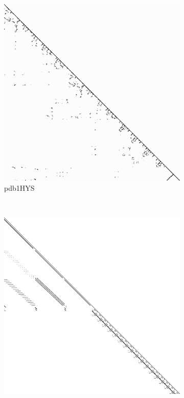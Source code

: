 \begin{figure}
\begin{multicols}{4}
\begin{subfigure}{\linewidth}
\includegraphics[width=\linewidth]{images/pdb1HYS}
\caption{pdb1HYS}
\end{subfigure}~%
\begin{subfigure}{\linewidth}
\includegraphics[width=\linewidth]{images/consph}

\end{subfigure}
\end{multicols}
\end{figure}
